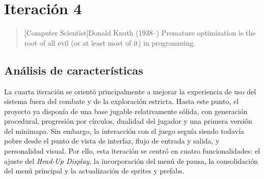 \chapter{Iteración 4}

\begin{quotation}[Computer Scientist]{Donald Knuth (1938--)}
Premature optimization is the root of all evil (or at least most of it) in programming.
\end{quotation}

\begin{abstract}
Esta iteración se orienta a mejorar la interacción del usuario con el sistema a través de
la interfaz y la presentación visual. Se consolidan el \textit{Head-Up Display}, el menú
de pausa y el menú principal del juego, y se actualizan los sprites y prefabs para aportar
una estética más propia al proyecto.
\end{abstract}

\section{Análisis de características}
La cuarta iteración se orientó principalmente a mejorar la experiencia de uso del sistema
fuera del combate y de la exploración estricta. Hasta este punto, el proyecto ya disponía
de una base jugable relativamente sólida, con generación procedural, progresión por
círculos, dualidad del jugador y una primera versión del minimapa. Sin embargo, la
interacción con el juego seguía siendo todavía pobre desde el punto de vista de interfaz,
flujo de entrada y salida, y personalidad visual. Por ello, esta iteración se centró en
cuatro funcionalidades: el ajuste del \textit{Head-Up Display}, la incorporación del menú
de pausa, la consolidación del menú principal y la actualización de sprites y prefabs.

